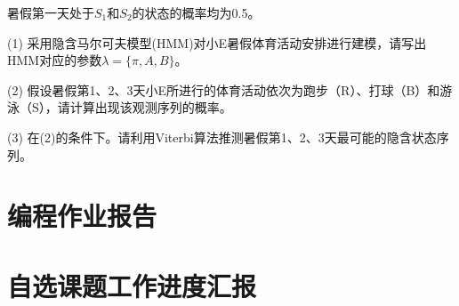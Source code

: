 \documentclass[a4paper]{article}
\begin{document}
\hspace{2em}暑假第一天处于$S_1$和$S_2$的状态的概率均为0.5。

\vspace{3mm}
(1) 采用隐含马尔可夫模型(HMM)对小E暑假体育活动安排进行建模，{\color{blue}请写出HMM对应的参数$\lambda=\{\pi, A, B\}$}。

\vspace{3mm}
(2) 假设暑假第1、2、3天小E所进行的体育活动依次为跑步（R）、打球（B）和游泳（S），{\color{blue}请计算出现该观测序列的概率}。

\vspace{3mm}
(3) 在(2)的条件下。{\color{blue}请利用Viterbi算法推测暑假第1、2、3天最可能的隐含状态序列}。


\section{编程作业报告}
\section{自选课题工作进度汇报}
\end{document}
